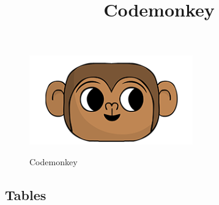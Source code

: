 \documentclass{article}
\title{Codemonkey}
\begin{document}
\begin{figure}[!ht]
   \centering
   \includegraphics[width=0.5\linewidth]{images/icon}
   \begin{titlepage}
      \huge Codemonkey
   \end{titlepage}
   \label{fig:nome-etichetta}
\end{figure}

\renewcommand{\contentsname}{Sommario}


\pagebreak
\tableofcontents
\pagebreak

\pagebreak

\pagebreak

\pagebreak



\pagebreak

\pagebreak

\pagebreak

\pagebreak

\pagebreak

\pagebreak

\pagebreak

\pagebreak

\pagebreak

\pagebreak


\subsection*{Tables}

\begin{tikzpicture}
   
\end{tikzpicture}
\end{document}
